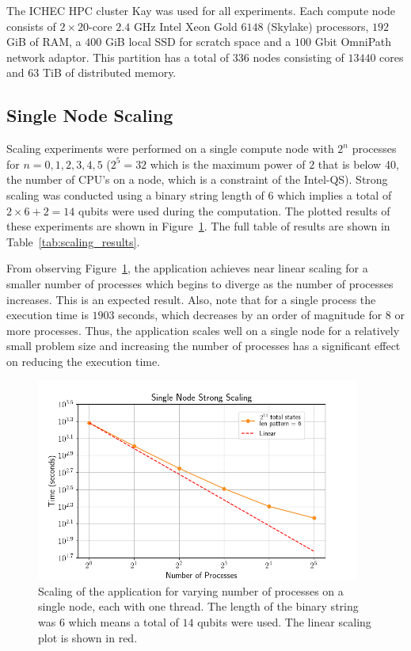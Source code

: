 The ICHEC HPC cluster Kay was used for all experiments. Each compute node consists of $2\times 20$-core $2.4$ GHz Intel Xeon Gold $6148$ (Skylake) processors, $192$ GiB of RAM, a $400$ GiB local SSD for scratch space and a $100$ Gbit OmniPath network adaptor. This partition has a total of $336$ nodes consisting of $13440$ cores and $63$ TiB of distributed memory.

\subsection{Single Node Scaling}
\label{sec:single_node_scaling}
Scaling experiments were performed on a single compute node with $2^n$ processes for $n=0,1,2,3,4,5$ ($2^5 = 32$ which is the maximum power of $2$ that is below 40, the number of CPU's on a node, which is a constraint of the Intel\textregistered-QS). Strong scaling was conducted using a binary string length of 6 which implies a total of $2\times 6 + 2 = 14$ qubits were used during the computation. The plotted results of these experiments are shown in Figure~\ref{fig:scaling_single_node}. The full table of results are shown in Table~\ref{tab:scaling_results}.

From observing Figure~\ref{fig:scaling_single_node}, the application achieves near linear scaling for a smaller number of processes which begins to diverge as the number of processes increases. This is an expected result. Also, note that for a single process the execution time is $1903$ seconds, which decreases by an order of magnitude for $8$ or more processes. Thus, the application scales well on a single node for a relatively small problem size and increasing the number of processes has a significant effect on reducing the execution time.


\begin{figure}[htbp]
    \centering
    \includegraphics[width=0.95\textwidth]{Images/Scaling/Single_Node_Strong_binlen6.png}
    \caption{Scaling of the application for varying number of processes on a single node, each with one thread. The length of the binary string was $6$ which means a total of $14$ qubits were used. The linear scaling plot is shown in red.}
    \label{fig:scaling_single_node}
\end{figure}

